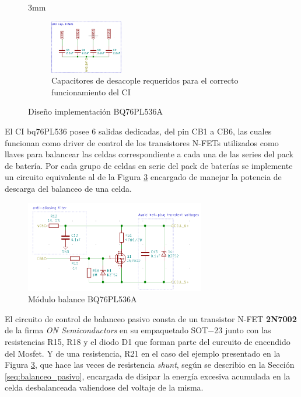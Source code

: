 \documentclass[10pt,a4paper]{article}
\begin{document}
\begin{itemize}
\begin{figure}[!h]
    \hfill{3mm}

    \begin{subfigure}[b]{\textwidth}
        \begin{center}
            \includegraphics[width=0.35\textwidth]{bq76_desacople.png}
            \caption{Capacitores de desacople requeridos para el correcto
            funcionamiento del \acrshort{CI}}
            \label{fig:bq76_implementation_uncouple}
        \end{center}
    \end{subfigure}
            \caption{Diseño implementación BQ76PL536A}
            \label{fig:bq76_implementation}
\end{figure}

El \acrshort{CI} bq76PL536 posee 6 salidas dedicadas, del pin CB1 a CB6, las
cuales funcionan como driver de control de los transistores N-FETs utilizados
como llaves para balancear las celdas correspondiente a cada una de las series
del pack de batería.
Por cada grupo de celdas en serie del pack de baterías se implemente un circuito
equivalente al de la Figura \ref{fig:bq76_balance_power} encargado de manejar
la potencia de descarga del balanceo de una celda.

\begin{figure}[!h]
    \begin{center}
        \includegraphics[width=0.7\textwidth]{hardware/bat_monitor/bat_mon_balance.png}
        \caption{Módulo balance BQ76PL536A}
        \label{fig:bq76_balance_power}
    \end{center}
\end{figure}

El circuito de control de balanceo pasivo consta de un transistor N-FET
\textbf{2N7002} de la firma \emph{ON Semiconductors} en su empaquetado SOT−23
junto con las resistencias R15, R18 y el diodo D1 que forman parte del curcuito
de encendido del Mosfet. Y de una resistencia, R21 en el caso del ejemplo
presentado en la Figura \ref{fig:bq76_balance_power}, que hace las veces de
resistencia \emph{shunt}, según se describio en la Sección
\ref{seq:balanceo_pasivo}, encargada de disipar la energía excesiva acumulada en
la celda desbalanceada valiendose del voltaje de la misma. 


\end{itemize}
\end{document}
